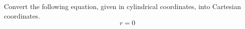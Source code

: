\begin{problem}
Convert the following equation, given in cylindrical coordinates, into Cartesian coordinates.
\[
r = 0
\]
\end{problem}